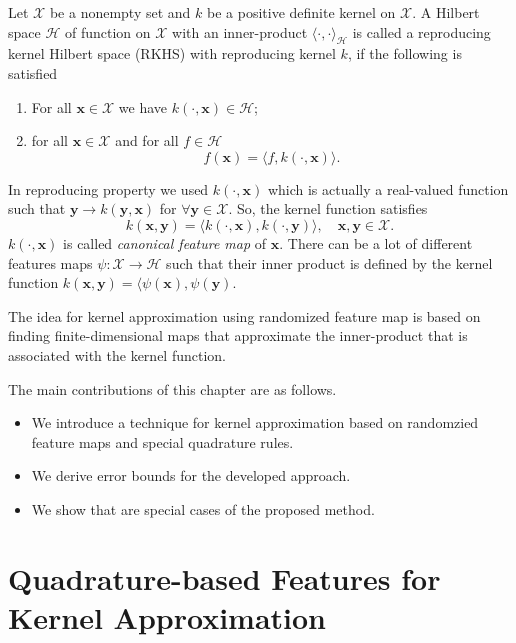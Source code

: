 \begin{definition}
Let $\mathcal{X}$ be a nonempty set and $k$ be a positive definite kernel on $\mathcal{X}$.
A Hilbert space $\mathcal{H}$ of function on $\mathcal{X}$ with an inner-product
$\langle \cdot, \cdot \rangle_{\mathcal{H}}$ is called a reproducing kernel
Hilbert space (RKHS) with reproducing kernel $k$, if the following is satisfied
    \begin{enumerate}
        \item For all $\mathbf{x} \in \mathcal{X}$ we have
        $k(\cdot, \mathbf{x}) \in \mathcal{H}$;
        \item for all $\mathbf{x} \in \mathcal{X}$ and for all $f\in \mathcal{H}$
        \[
            f(\mathbf{x}) = \langle f, k(\cdot, \mathbf{x}) \rangle
            \tag*{Reproducing property}.
        \]
    \end{enumerate}
\end{definition}
In reproducing property we used $k(\cdot, \mathbf{x})$ which is actually
a real-valued function such that $\mathbf{y} \rightarrow k(\mathbf{y, x})$
for $\forall \mathbf{y} \in \mathcal{X}$.
So, the kernel function satisfies
\[
    k(\mathbf{x, y}) = \langle k(\cdot, \mathbf{x}), k(\cdot, \mathbf{y}) \rangle,
    \quad \mathbf{x, y} \in \mathcal{X}.
\]
$k(\cdot, \mathbf{x})$ is called {\em canonical feature map} of $\mathbf{x}$.
There can be a lot of different features maps
$\psi \colon \mathcal{X} \rightarrow \mathcal{H}$ such that their inner product is defined
by the kernel function $k(\mathbf{x, y}) = \langle \psi(\mathbf{x}), \psi(\mathbf{y})$.

The idea for kernel approximation using randomized feature map is based
on finding finite-dimensional maps that approximate the inner-product that is associated
with the kernel function.

The main contributions of this chapter are as follows.
\begin{itemize}
    \item We introduce a technique for kernel approximation based on randomzied feature maps
    and special quadrature rules.
    \item We derive error bounds for the developed approach.
    \item We show that \citep{rahimi2008random,felix2016orthogonal} are special cases of the
    proposed method.
\end{itemize}




\section{Quadrature-based Features for Kernel Approximation}

